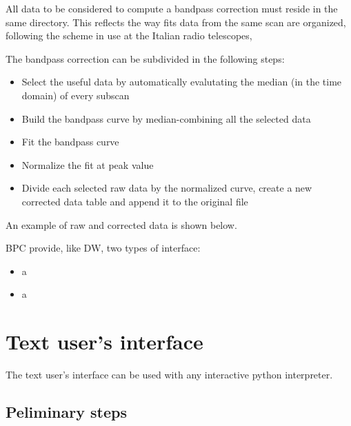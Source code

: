 \documentclass[letterpaper,10pt,english]{sphinxmanual}
\begin{document}
All data to be considered to compute a bandpass correction must reside in the same directory. This reflects the way fits data from the same scan are organized, following the scheme in use at the Italian radio telescopes,

The bandpass correction can be subdivided in the following steps:
\begin{itemize}
\item {} 
Select the useful data by automatically evalutating the median (in the time domain) of every subscan

\item {} 
Build the bandpass curve by median-combining all the selected data

\item {} 
Fit the bandpass curve

\item {} 
Normalize the fit at peak value

\item {} 
Divide each selected raw data by the normalized curve, create a new corrected data table and append it to the original file

\end{itemize}

An example of raw and corrected data is shown below.


BPC provide, like DW, two types of interface:
\begin{itemize}
\item {} 
a {\hyperref[tuibp::doc]{}}

\item {} 
a {\hyperref[guibp::doc]{}}

\end{itemize}


\section{Text user's interface}
\label{tuibp:text-user-s-interface}\label{tuibp::doc}
The text user's interface can be used with any interactive python interpreter.


\subsection{Peliminary steps}
\label{tuibp:peliminary-steps}
\end{document}
